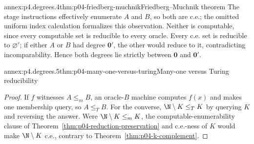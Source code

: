 \begin{annexitem}{annex:p4.degrees.4}{thm:p04-friedberg-muchnik}{Friedberg--Muchnik theorem}
The stage instructions effectively enumerate \(A\) and \(B\), so both are
c.e.; the omitted uniform index calculation formalizes this observation.
Neither
is computable, since every computable set is reducible to every oracle.  Every
c.e. set is reducible to \(\varnothing'\); if either \(A\) or \(B\) had degree
\(\mathbf0'\), the other would reduce to it, contradicting incomparability.
Hence both degrees lie strictly between \(\mathbf0\) and \(\mathbf0'\).
\end{annexitem}

\begin{annexitem}{annex:p4.degrees.5}{thm:p04-many-one-versus-turing}{Many-one versus Turing reducibility}
\enlargethispage{4\baselineskip}
\begin{proof}
If \(f\) witnesses \(A\leq_mB\), an oracle-\(B\) machine computes \(f(x)\)
and makes one membership query, so \(A\leq_TB\).  For the converse,
\(\N\setminus K\leq_TK\) by querying \(K\) and reversing the answer.  Were
\(\N\setminus K\leq_mK\), the computable-enumerability clause of
Theorem~\ref{thm:p04-reduction-preservation} and c.e.-ness of \(K\) would make
\(\N\setminus K\) c.e., contrary to
Theorem~\ref{thm:p04-k-complement}.
\end{proof}
\end{annexitem}

